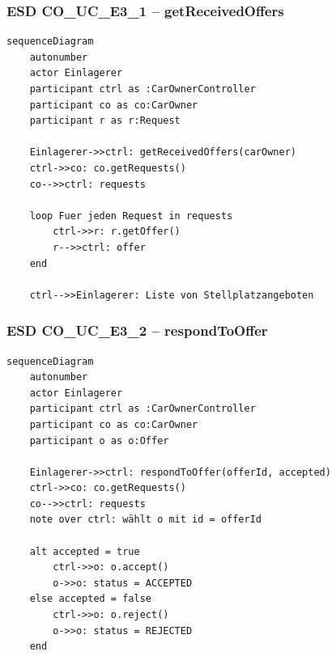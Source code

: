 \subsubsection*{ESD CO\_UC\_E3\_1 – getReceivedOffers}

\begin{lstlisting}[basicstyle=\ttfamily\small, breaklines=true]
sequenceDiagram
    autonumber
    actor Einlagerer
    participant ctrl as :CarOwnerController
    participant co as co:CarOwner
    participant r as r:Request

    Einlagerer->>ctrl: getReceivedOffers(carOwner)
    ctrl->>co: co.getRequests()
    co-->>ctrl: requests

    loop Fuer jeden Request in requests
        ctrl->>r: r.getOffer()
        r-->>ctrl: offer
    end

    ctrl-->>Einlagerer: Liste von Stellplatzangeboten
\end{lstlisting}

\newpage

{}
\subsubsection*{ESD CO\_UC\_E3\_2 – respondToOffer}

\begin{lstlisting}[basicstyle=\ttfamily\small, breaklines=true]
sequenceDiagram
    autonumber
    actor Einlagerer
    participant ctrl as :CarOwnerController
    participant co as co:CarOwner
    participant o as o:Offer

    Einlagerer->>ctrl: respondToOffer(offerId, accepted)
    ctrl->>co: co.getRequests()
    co-->>ctrl: requests
    note over ctrl: wählt o mit id = offerId

    alt accepted = true
        ctrl->>o: o.accept()
        o->>o: status = ACCEPTED
    else accepted = false
        ctrl->>o: o.reject()
        o->>o: status = REJECTED
    end
\end{lstlisting}

\newpage

{}
